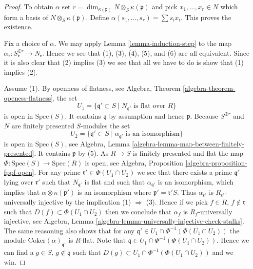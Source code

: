 \begin{proof}
To obtain $\alpha$ set
$r = \dim_{\kappa(\mathfrak p)} N \otimes_S \kappa(\mathfrak p)$ and pick
$x_1, \ldots, x_r \in N$ which form a basis of
$N \otimes_S \kappa(\mathfrak p)$. Define
$\alpha(s_1, \ldots, s_r) = \sum s_i x_i$. This proves the existence.

\medskip\noindent
Fix a choice of $\alpha$.
We may apply
Lemma \ref{lemma-induction-step}
to the map
$\alpha_{\mathfrak r} : S_{\mathfrak r}^{\oplus r} \to N_{\mathfrak r}$.
Hence we see that (1), (3), (4), (5), and (6) are all equivalent.
Since it is also clear that (2) implies (3) we see that all we have to
do is show that (1) implies (2).

\medskip\noindent
Assume (1). By openness of flatness, see
Algebra, Theorem \ref{algebra-theorem-openess-flatness},
the set
$$
U_1 = \{\mathfrak q' \subset S \mid N_{\mathfrak q'}\text{ is flat over }R\}
$$
is open in $\text{Spec}(S)$. It contains $\mathfrak q$ by assumption
and hence $\mathfrak p$. Because $S^{\oplus r}$ and $N$ are finitely presented
$S$-modules the set
$$
U_2 = \{\mathfrak q' \subset S \mid
\alpha_{\mathfrak q'}\text{ is an isomorphism}\}
$$
is open in $\text{Spec}(S)$, see
Algebra, Lemma \ref{algebra-lemma-map-between-finitely-presented}.
It contains $\mathfrak p$ by (5). As $R \to S$
is finitely presented and flat the map
$\Phi : \text{Spec}(S) \to \text{Spec}(R)$ is open, see
Algebra, Proposition \ref{algebra-proposition-fppf-open}.
For any prime $\mathfrak r' \in \Phi(U_1 \cap U_2)$ we see that
there exists a prime $\mathfrak q'$ lying over $\mathfrak r'$ such that
$N_{\mathfrak q'}$ is flat and such that $\alpha_{\mathfrak q'}$ is
an isomorphism, which implies that $\alpha \otimes \kappa(\mathfrak p')$
is an isomorphism where $\mathfrak p' = \mathfrak r' S$. Thus
$\alpha_{\mathfrak r'}$ is $R_{\mathfrak r'}$-universally injective
by the implication (1) $\Rightarrow$ (3).
Hence if we pick $f \in R$, $f \not \in \mathfrak r$ such that
$D(f) \subset \Phi(U_1 \cap U_2)$ then we conclude that
$\alpha_f$ is $R_f$-universally injective, see
Algebra, Lemma \ref{algebra-lemma-universally-injective-check-stalks}.
The same reasoning also shows that for any
$\mathfrak q' \in U_1 \cap \Phi^{-1}(\Phi(U_1 \cap U_2))$
the module $\text{Coker}(\alpha)_{\mathfrak q'}$ is $R$-flat.
Note that $\mathfrak q \in U_1 \cap \Phi^{-1}(\Phi(U_1 \cap U_2))$.
Hence we can find a $g \in S$, $g \not \in \mathfrak q$ such
that $D(g) \subset U_1 \cap \Phi^{-1}(\Phi(U_1 \cap U_2))$
and we win.
\end{proof}



